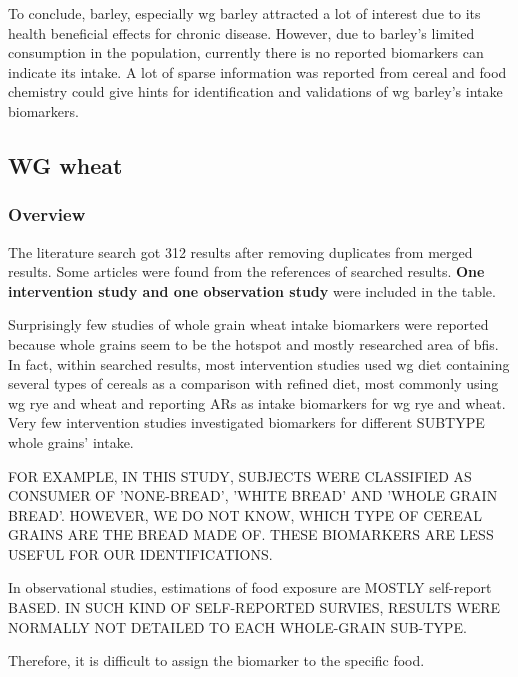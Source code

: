 To conclude, barley, especially \acrshort{wg} barley attracted a lot of interest due to its health beneficial effects for chronic disease. However, due to barley's limited consumption in the population, currently there is no reported biomarkers can indicate its intake. A lot of sparse information was reported from cereal and food chemistry could give hints for identification and validations of \acrshort{wg} barley's intake biomarkers.

\subsection{WG wheat}
\subsubsection{Overview}
The literature search got 312 results after removing duplicates from merged results. Some articles were found from the references of searched results. 
\textbf{One intervention study and one observation study} %
were included in the table. 

Surprisingly few studies of whole grain wheat intake biomarkers were reported because whole grains seem to be the hotspot and mostly researched area of \acrshort{bfis}.
In fact, within searched results, most intervention studies used \acrshort{wg} diet containing several types of cereals as a comparison with refined diet, most commonly using \acrshort{wg} rye and wheat and reporting ARs as intake biomarkers for \acrshort{wg} rye and wheat. 
Very few intervention studies investigated biomarkers for different SUBTYPE whole grains' intake. 


FOR EXAMPLE, IN THIS STUDY\cite{ISI:000348343300015}, SUBJECTS WERE CLASSIFIED AS CONSUMER OF 'NONE-BREAD', 'WHITE BREAD' AND 'WHOLE GRAIN BREAD'. HOWEVER, WE DO NOT KNOW, WHICH TYPE OF CEREAL GRAINS ARE THE BREAD MADE OF. THESE BIOMARKERS ARE LESS USEFUL FOR OUR IDENTIFICATIONS.

In observational studies, estimations of food exposure are MOSTLY self-report BASED. IN SUCH KIND OF SELF-REPORTED SURVIES, RESULTS WERE NORMALLY NOT DETAILED TO EACH WHOLE-GRAIN SUB-TYPE.

Therefore, it is difficult to assign the biomarker to the specific food.

